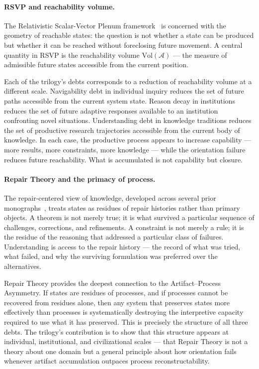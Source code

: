 \paragraph{RSVP and reachability volume.}
The Relativistic Scalar-Vector Plenum framework~\cite{rsvp2024} is concerned
with the geometry of reachable states: the question is not whether a state
can be produced but whether it can be reached without foreclosing future
movement. A central quantity in RSVP is the reachability volume $\mathrm{Vol}(\mathcal{A})$
--- the measure of admissible future states accessible from the current position.

Each of the trilogy's debts corresponds to a reduction of reachability volume
at a different scale. Navigability debt in individual inquiry reduces the
set of future paths accessible from the current system state. Reason decay
in institutions reduces the set of future adaptive responses available to
an institution confronting novel situations. Understanding debt in knowledge
traditions reduces the set of productive research trajectories accessible from
the current body of knowledge. In each case, the productive process appears
to increase capability --- more results, more constraints, more knowledge ---
while the orientation failure reduces future reachability. What is accumulated
is not capability but closure.

\paragraph{Repair Theory and the primacy of process.}
The repair-centered view of knowledge, developed across several prior
monographs~\cite{geometry2025}, treats states as residues of repair histories
rather than primary objects. A theorem is not merely true; it is what survived
a particular sequence of challenges, corrections, and refinements. A constraint
is not merely a rule; it is the residue of the reasoning that addressed a
particular class of failures. Understanding is access to the repair history
--- the record of what was tried, what failed, and why the surviving formulation
was preferred over the alternatives.

Repair Theory provides the deepest connection to the Artifact--Process
Asymmetry. If states are residues of processes, and if processes cannot be
recovered from residues alone, then any system that preserves states more
effectively than processes is systematically destroying the interpretive
capacity required to use what it has preserved. This is precisely the structure
of all three debts. The trilogy's contribution is to show that this structure
appears at individual, institutional, and civilizational scales --- that
Repair Theory is not a theory about one domain but a general principle about
how orientation fails whenever artifact accumulation outpaces process
reconstructability.

